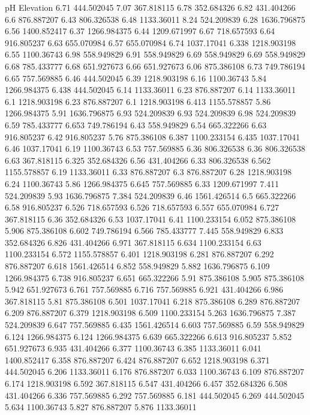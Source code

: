 pH	Elevation
6.71	444.502045
7.07	367.818115
6.78	352.684326
6.82	431.404266
6.6	876.887207
6.43	806.326538
6.48	1133.36011
8.24	524.209839
6.28	1636.796875
6.56	1400.852417
6.37	1266.984375
6.44	1209.671997
6.67	718.657593
6.64	916.805237
6.63	655.070984
6.57	655.070984
6.74	1037.17041
6.338	1218.903198
6.55	1100.36743
6.98	558.949829
6.91	558.949829
6.69	558.949829
6.69	558.949829
6.68	785.433777
6.68	651.927673
6.66	651.927673
6.06	875.386108
6.73	749.786194
6.65	757.569885
6.46	444.502045
6.39	1218.903198
6.16	1100.36743
5.84	1266.984375
6.438	444.502045
6.14	1133.36011
6.23	876.887207
6.14	1133.36011
6.1	1218.903198
6.23	876.887207
6.1	1218.903198
6.413	1155.578857
5.86	1266.984375
5.91	1636.796875
6.93	524.209839
6.93	524.209839
6.98	524.209839
6.59	785.433777
6.653	749.786194
6.43	558.949829
6.54	665.322266
6.63	916.805237
6.42	916.805237
5.76	875.386108
6.387	1100.233154
6.435	1037.17041
6.46	1037.17041
6.19	1100.36743
6.53	757.569885
6.36	806.326538
6.36	806.326538
6.63	367.818115
6.325	352.684326
6.56	431.404266
6.33	806.326538
6.562	1155.578857
6.19	1133.36011
6.33	876.887207
6.3	876.887207
6.28	1218.903198
6.24	1100.36743
5.86	1266.984375
6.645	757.569885
6.33	1209.671997
7.411	524.209839
5.93	1636.796875
7.384	524.209839
6.46	1561.426514
6.5	665.322266
6.58	916.805237
6.526	718.657593
6.526	718.657593
6.557	655.070984
6.727	367.818115
6.36	352.684326
6.53	1037.17041
6.41	1100.233154
6.052	875.386108
5.906	875.386108
6.602	749.786194
6.566	785.433777
7.445	558.949829
6.833	352.684326
6.826	431.404266
6.971	367.818115
6.634	1100.233154
6.63	1100.233154
6.572	1155.578857
6.401	1218.903198
6.281	876.887207
6.292	876.887207
6.618	1561.426514
6.852	558.949829
5.882	1636.796875
6.109	1266.984375
6.738	916.805237
6.651	665.322266
5.91	875.386108
5.905	875.386108
5.942	651.927673
6.761	757.569885
6.716	757.569885
6.921	431.404266
6.986	367.818115
5.81	875.386108
6.501	1037.17041
6.218	875.386108
6.289	876.887207
6.209	876.887207
6.379	1218.903198
6.509	1100.233154
5.263	1636.796875
7.387	524.209839
6.647	757.569885
6.435	1561.426514
6.603	757.569885
6.59	558.949829
6.124	1266.984375
6.124	1266.984375
6.639	665.322266
6.613	916.805237
5.852	651.927673
6.935	431.404266
6.377	1100.36743
6.385	1133.36011
6.041	1400.852417
6.358	876.887207
6.424	876.887207
6.652	1218.903198
6.371	444.502045
6.206	1133.36011
6.176	876.887207
6.033	1100.36743
6.109	876.887207
6.174	1218.903198
6.592	367.818115
6.547	431.404266
6.457	352.684326
6.508	431.404266
6.336	757.569885
6.292	757.569885
6.181	444.502045
6.269	444.502045
5.634	1100.36743
5.827	876.887207
5.876	1133.36011
